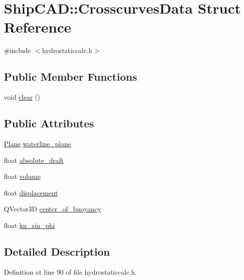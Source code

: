\hypertarget{structShipCAD_1_1CrosscurvesData}{\section{Ship\-C\-A\-D\-:\-:Crosscurves\-Data Struct Reference}
\label{structShipCAD_1_1CrosscurvesData}
}


{\ttfamily \#include $<$hydrostaticcalc.\-h$>$}

\subsection*{Public Member Functions}
\begin{DoxyCompactItemize}
\item 
void \hyperlink{structShipCAD_1_1CrosscurvesData_a2fcb82c940ad6a13c07a25f44bbd5efd}{clear} ()
\end{DoxyCompactItemize}
\subsection*{Public Attributes}
\begin{DoxyCompactItemize}
\item 
\hyperlink{classShipCAD_1_1Plane}{Plane} \hyperlink{structShipCAD_1_1CrosscurvesData_a1ea6de1b52289e8392e8d499ae4aad04}{waterline\-\_\-plane}
\item 
float \hyperlink{structShipCAD_1_1CrosscurvesData_a759e5729cdb86d8367b139e66fecb7d3}{absolute\-\_\-draft}
\item 
float \hyperlink{structShipCAD_1_1CrosscurvesData_a9bec38a77bf87ab5feb76899e39e4f7b}{volume}
\item 
float \hyperlink{structShipCAD_1_1CrosscurvesData_a9a7baa66159e203888390eaa63caf708}{displacement}
\item 
Q\-Vector3\-D \hyperlink{structShipCAD_1_1CrosscurvesData_a0de723cd5ae0e18953fb7ad5a0f5dadf}{center\-\_\-of\-\_\-buoyancy}
\item 
float \hyperlink{structShipCAD_1_1CrosscurvesData_a55150860fed821e314e18b72f1975749}{kn\-\_\-sin\-\_\-phi}
\end{DoxyCompactItemize}


\subsection{Detailed Description}


Definition at line 90 of file hydrostaticcalc.\-h.



